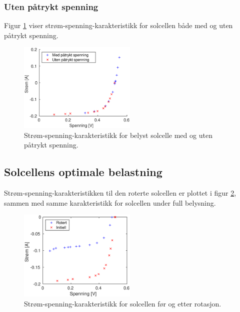 \documentclass[a4paper,11pt, twocolumn]{article}
\begin{document}
\subsubsection{Uten påtrykt spenning}
Figur \ref{fig:resUtenSpenning} viser strøm-spenning-karakteristikk for solcellen både med og uten påtrykt spenning.
\begin{figure}[!ht]
	\includegraphics[width = 0.5\textwidth]{matlab/LAB/utenSpenning.eps}
	\caption{Strøm-spenning-karakteristikk for belyst solcelle med og uten påtrykt spenning.}
	\label{fig:resUtenSpenning}
\end{figure}

\subsection{Solcellens optimale belastning}
Strøm-spenning-karakteristikken til den roterte solcellen er plottet i figur \ref{fig:currentVoltageRotation}, sammen med samme karakteristikk for solcellen under full belysning.

\begin{figure}[!ht]
	\includegraphics[width = 0.5\textwidth]{matlab/LAB/currentVoltageRotated.eps}
	\caption{Strøm-spenning-karakteristikk for solcellen før og etter rotasjon.}
	\label{fig:currentVoltageRotation}
\end{figure}
\end{document}

